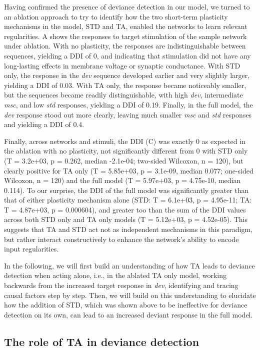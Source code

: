 \documentclass[9pt,lineno,onehalfspacing]{elife}
\newcommand{\dev}{\textit{dev}}
\newcommand{\msc}{\textit{msc}}
\newcommand{\std}{\textit{std}}
\begin{document}
Having confirmed the presence of deviance detection in our model, we turned to an ablation approach to try to identify how the two short-term plasticity mechanisms in the model, STD and TA, enabled the networks to learn relevant regularities. A shows the responses to target stimulation of the sample network under ablation. With no plasticity, the responses are indistinguishable between sequences, yielding a DDI of 0, and indicating that stimulation did not have any long-lasting effects in membrane voltage or synaptic conductance. With STD only, the response in the \dev{} sequence developed earlier and very slightly larger, yielding a DDI of 0.03. With TA only, the response became noticeably smaller, but the sequences became readily distinguishable, with high \dev{}, intermediate \msc{}, and low \std{} responses, yielding a DDI of 0.19. Finally, in the full model, the \dev{} response stood out more clearly, leaving much smaller \msc{} and \std{} responses and yielding a DDI of 0.4.

Finally, across networks and stimuli, the DDI (C) was exactly 0 as expected in the ablation with no plasticity, not significantly different from 0 with STD only (T = 3.2e+03, p = 0.262, median -2.1e-04; two-sided Wilcoxon, n = 120), but clearly positive for TA only (T = 5.85e+03, p = 3.1e-09, median 0.077; one-sided Wilcoxon, n = 120) and the full model (T = 5.97e+03, p = 4.75e-10, median 0.114). To our surprise, the DDI of the full model was significantly greater than that of either plasticity mechanism alone (STD: T = 6.1e+03, p = 4.95e-11; TA: T = 4.87e+03, p = 0.000604), and greater too than the sum of the DDI values across both STD only and TA only models (T = 5.12e+03, p = 4.52e-05). This suggests that TA and STD act not as independent mechanisms in this paradigm, but rather interact constructively to enhance the network's ability to encode input regularities.

In the following, we will first build an understanding of how TA leads to deviance detection when acting alone, i.e., in the ablated TA only model, working backwards from the increased target response in \dev{}, identifying and tracing causal factors step by step. Then, we will build on this understanding to elucidate how the addition of STD, which was shown above to be ineffective for deviance detection on its own, can lead to an increased deviant response in the full model.

\subsection{The role of TA in deviance detection}\label{sec:ta}
\end{document}

